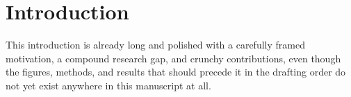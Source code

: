 \documentclass{article}
\begin{document}
\section{Introduction}
This introduction is already long and polished with a carefully framed motivation, a compound research gap, and crunchy contributions, even though the figures, methods, and results that should precede it in the drafting order do not yet exist anywhere in this manuscript at all.
\end{document}
